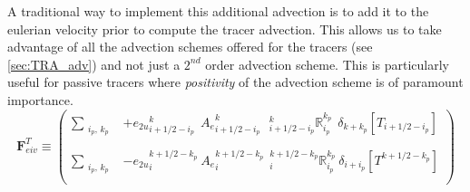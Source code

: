 \documentclass[../tex_main/NEMO_manual]{subfiles}
\begin{document}
A traditional way to implement this additional advection is to add it to the eulerian 
velocity prior to compute the tracer advection. This allows us to take advantage of 
all the advection schemes offered for the tracers (see \autoref{sec:TRA_adv}) and not just 
a $2^{nd}$ order advection scheme. This is particularly useful for passive tracers 
where \emph{positivity} of the advection scheme is of paramount importance. 
\begin{equation} \label{eq:eiv_vd}  
\textbf{F}_{eiv}^T   \equiv   \left( \begin{aligned}                                
 \sum_{\substack{i_p,\,k_p}} &
 +{e_{2u}}_{i+1/2-i_p}^{k}                                  \ \ {A_{e}}_{i+1/2-i_p}^{k} 
\ \ \ { _{i+1/2-i_p}^k \mathbb{R}_{i_p}^{k_p} }    \ \ \delta_{k+k_p}[T_{i+1/2-i_p}]      \\
    \\
 \sum_{\substack{i_p,\,k_p}} &
 - {e_{2u}}_i^{k+1/2-k_p}                                      \ {A_{e}}_i^{k+1/2-k_p} 
\ \ { _i^{k+1/2-k_p} \mathbb{R}_{i_p}^{k_p} }    \ \delta_{i+i_p}[T^{k+1/2-k_p}]    \\   
\end{aligned}   \right)
\end{equation}
\end{document}
